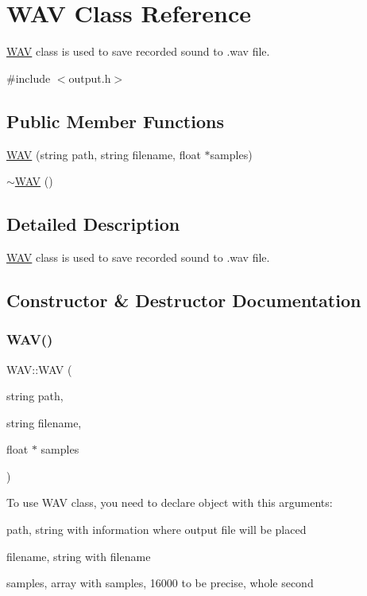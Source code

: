 \hypertarget{class_w_a_v}{}\section{W\+AV Class Reference}
\label{class_w_a_v}


\hyperlink{class_w_a_v}{W\+AV} class is used to save recorded sound to .wav file.  




{\ttfamily \#include $<$output.\+h$>$}

\subsection*{Public Member Functions}
\begin{DoxyCompactItemize}
\item 
\hyperlink{class_w_a_v_a880dc49a874ddd85f7404ed772415da4}{W\+AV} (string path, string filename, float $\ast$samples)
\item 
\hyperlink{class_w_a_v_abf955e178e2e6682dbcf99b1f94db7a2}{$\sim$\+W\+AV} ()
\end{DoxyCompactItemize}


\subsection{Detailed Description}
\hyperlink{class_w_a_v}{W\+AV} class is used to save recorded sound to .wav file. 

\subsection{Constructor \& Destructor Documentation}
\mbox{\label{class_w_a_v_a880dc49a874ddd85f7404ed772415da4}} 
\subsubsection{\texorpdfstring{W\+A\+V()}{WAV()}}
{\footnotesize\ttfamily W\+A\+V\+::\+W\+AV (\begin{DoxyParamCaption}\item[{string}]{path,  }\item[{string}]{filename,  }\item[{float $\ast$}]{samples }\end{DoxyParamCaption})}

To use W\+AV class, you need to declare object with this arguments\+:
\begin{DoxyItemize}
\item path, string with information where output file will be placed
\item filename, string with filename
\item samples, array with samples, 16000 to be precise, whole second
\end{DoxyItemize}

